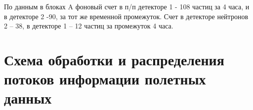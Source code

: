 По данным в блоках A фоновый счет в п/п детекторе 1 - 108 частиц за 4 часа, и в детекторе 2 -90, за тот же временной промежуток. Счет в детекторе нейтронов 2 – 38, в детекторе 1 – 12 частиц за промежуток 4  часа.


\section{Схема обработки и распределения потоков информации полетных данных}\label{sec3.2}
